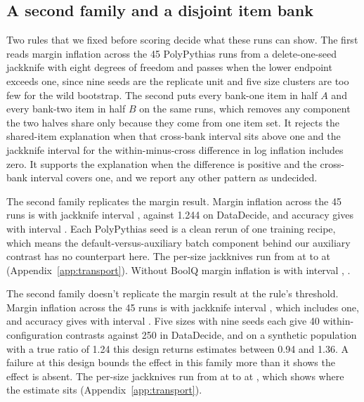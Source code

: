 \subsection{A second family and a disjoint item bank}
\label{sec:family}
Two rules that we fixed before scoring decide what these runs can show. The first reads margin inflation across the 45 PolyPythias runs from a delete-one-seed jackknife with eight degrees of freedom and passes when the lower endpoint exceeds one, since nine seeds are the replicate unit and five size clusters are too few for the wild bootstrap. The second puts every bank-one item in half $A$ and every bank-two item in half $B$ on the same runs, which removes any component the two halves share only because they come from one item set. It rejects the shared-item explanation when that cross-bank interval sits above one and the jackknife interval for the within-minus-cross difference in log inflation includes zero. It supports the explanation when the difference is positive and the cross-bank interval covers one, and we report any other pattern as undecided.

The second family replicates the margin result. Margin inflation across the 45 runs is  with jackknife interval , against 1.244 on DataDecide, and accuracy gives  with interval . Each PolyPythias seed is a clean rerun of one training recipe, which means the default-versus-auxiliary batch component behind our auxiliary contrast has no counterpart here. The per-size jackknives run from  at  to  at  (Appendix~\ref{app:transport}). Without BoolQ margin inflation is  with interval , .

The second family doesn't replicate the margin result at the rule's threshold. Margin inflation across the 45 runs is  with jackknife interval , which includes one, and accuracy gives  with interval . Five sizes with nine seeds each give 40 within-configuration contrasts against 250 in DataDecide, and on a synthetic population with a true ratio of 1.24 this design returns estimates between 0.94 and 1.36. %
A failure at this design bounds the effect in this family more than it shows the effect is absent. The per-size jackknives run from  at  to  at , which shows where the estimate sits (Appendix~\ref{app:transport}).

